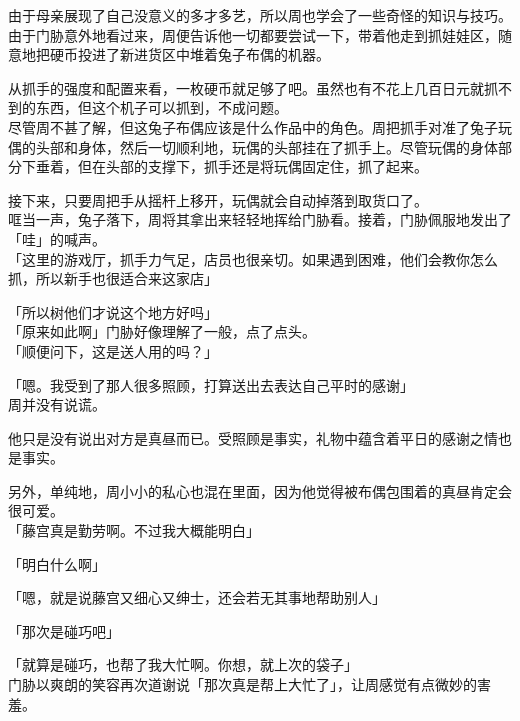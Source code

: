 由于母亲展现了自己没意义的多才多艺，所以周也学会了一些奇怪的知识与技巧。\\

由于门胁意外地看过来，周便告诉他一切都要尝试一下，带着他走到抓娃娃区，随意地把硬币投进了新进货区中堆着兔子布偶的机器。

从抓手的强度和配置来看，一枚硬币就足够了吧。虽然也有不花上几百日元就抓不到的东西，但这个机子可以抓到，不成问题。\\

尽管周不甚了解，但这兔子布偶应该是什么作品中的角色。周把抓手对准了兔子玩偶的头部和身体，然后一切顺利地，玩偶的头部挂在了抓手上。尽管玩偶的身体部分下垂着，但在头部的支撑下，抓手还是将玩偶固定住，抓了起来。

接下来，只要周把手从摇杆上移开，玩偶就会自动掉落到取货口了。\\

哐当一声，兔子落下，周将其拿出来轻轻地挥给门胁看。接着，门胁佩服地发出了「哇」的喊声。\\

「这里的游戏厅，抓手力气足，店员也很亲切。如果遇到困难，他们会教你怎么抓，所以新手也很适合来这家店」

「所以树他们才说这个地方好吗」\\

「原来如此啊」门胁好像理解了一般，点了点头。\\

「顺便问下，这是送人用的吗？」

「嗯。我受到了那人很多照顾，打算送出去表达自己平时的感谢」\\

周并没有说谎。

他只是没有说出对方是真昼而已。受照顾是事实，礼物中蕴含着平日的感谢之情也是事实。

另外，单纯地，周小小的私心也混在里面，因为他觉得被布偶包围着的真昼肯定会很可爱。\\

「藤宫真是勤劳啊。不过我大概能明白」%

「明白什么啊」

「嗯，就是说藤宫又细心又绅士，还会若无其事地帮助别人」

「那次是碰巧吧」

「就算是碰巧，也帮了我大忙啊。你想，就上次的袋子」\\

门胁以爽朗的笑容再次道谢说「那次真是帮上大忙了」，让周感觉有点微妙的害羞。\\

